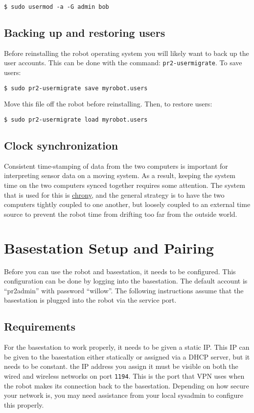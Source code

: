\begin{verbatim}
$ sudo usermod -a -G admin bob
\end{verbatim}

\subsection{Backing up and restoring users}
Before reinstalling the robot operating system you will likely want to
back up the user accounts. This can be done with the command:
\texttt{pr2-usermigrate}. To save users:
\begin{verbatim}
$ sudo pr2-usermigrate save myrobot.users
\end{verbatim}

Move this file off the robot before reinstalling.  Then, to restore users:
\begin{verbatim}
$ sudo pr2-usermigrate load myrobot.users
\end{verbatim}


\subsection{Clock synchronization}
Consistent time-stamping of data from the two computers is important
for interpreting sensor data on a moving system.  As a result, keeping
the system time on the two computers synced together requires some
attention.  The system that is used for this is
\href{http://chrony.tuxfamily.org/}{chrony}, and the general strategy
is to have the two computers tightly coupled to one another, but
loosely coupled to an external time source to prevent the robot time
from drifting too far from the outside world.

\section{Basestation Setup and Pairing}
Before you can use the robot and basestation, it needs to be
configured.  This configuration can be done by logging into the
basestation.  The default account is ``pr2admin'' with password
``willow''.  The following instructions assume that the basestation is
plugged into the robot via the service port.

\subsection{Requirements}
For the basestation to work properly, it needs to be given a static
IP.  This IP can be given to the basestation either statically or
assigned via a DHCP server, but it needs to be constant.  the IP
address you assign it must be visible on both the wired and wireless
networks on port \texttt{1194}.  This is the port that VPN uses when
the robot makes its connection back to the basestation.  Depending on
how secure your network is, you may need assistance from your local
sysadmin to configure this properly.

